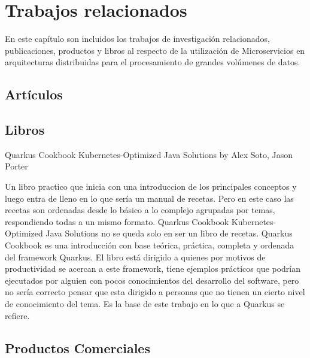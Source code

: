 \chapter{Trabajos relacionados}

En este capítulo son incluidos  los trabajos de investigación relacionados, publicaciones, productos y libros al respecto de la utilización de Microservicios en arquitecturas distribuidas para el procesamiento de grandes volúmenes de datos.

\section{Artículos}








\section{Libros}

Quarkus Cookbook Kubernetes-Optimized Java Solutions by Alex Soto, Jason Porter

Un libro practico que inicia con una introduccion de los principales conceptos y luego entra de lleno en lo que sería un manual de recetas. Pero en este caso las recetas son ordenadas desde lo básico a lo complejo agrupadas por temas, respondiendo todas a un mismo formato. Quarkus Cookbook Kubernetes-Optimized Java Solutions no se queda solo en ser un libro de recetas. Quarkus Cookbook es una introducción con base teórica, práctica, completa y ordenada del framework Quarkus. El libro está dirigido a quienes por motivos de productividad se acercan a este framework, tiene ejemplos prácticos que podrían ejecutados por alguien con pocos conocimientos del desarrollo del software, pero no sería correcto pensar que esta dirigido a personas que no tienen un cierto nivel de conocimiento del tema. Es la base de este trabajo en lo que a Quarkus se refiere. 
\par



\section{Productos Comerciales}